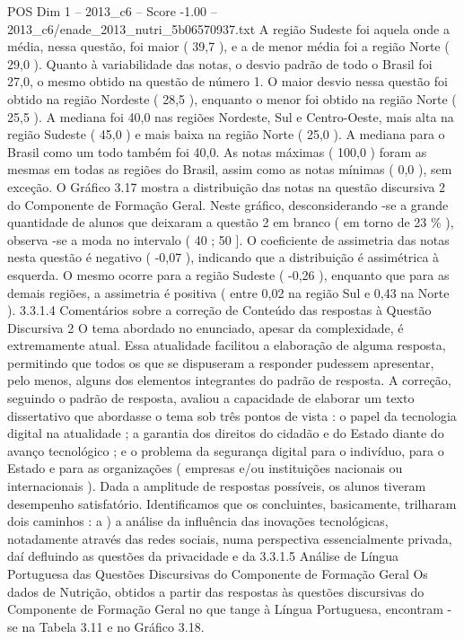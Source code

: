 \begin{textsample}{POS Dim 1 – 2013\_c6 – Score -1.00 – 2013\_c6/enade\_2013\_nutri\_5b06570937.txt}
A região Sudeste foi aquela onde a média, nessa questão, foi maior ( 39,7 ), e a de menor média foi a região Norte ( 29,0 ).
Quanto à variabilidade das notas, o desvio padrão de todo o Brasil foi 27,0, o mesmo obtido na questão de número 1.
O maior desvio nessa questão foi obtido na região Nordeste ( 28,5 ), enquanto o menor foi obtido na região Norte ( 25,5 ).
A mediana foi 40,0 nas regiões Nordeste, Sul e Centro-Oeste, mais alta na região Sudeste ( 45,0 ) e mais baixa na região Norte ( 25,0 ).
A mediana para o Brasil como um todo também foi 40,0.
As notas máximas ( 100,0 ) foram as mesmas em todas as regiões do Brasil, assim como as notas mínimas ( 0,0 ), sem exceção.
O Gráfico 3.17 mostra a distribuição das notas na questão discursiva 2 do Componente de Formação Geral.
Neste gráfico, desconsiderando -se a grande quantidade de alunos que deixaram a questão 2 em branco ( em torno de 23 \% ), observa -se a moda no intervalo ( 40 ; 50 ].
O coeficiente de assimetria das notas nesta questão é negativo ( -0,07 ), indicando que a distribuição é assimétrica à esquerda.
O mesmo ocorre para a região Sudeste ( -0,26 ), enquanto que para as demais regiões, a assimetria é positiva ( entre 0,02 na região Sul e 0,43 na Norte ). 3.3.1.4 Comentários sobre a correção de Conteúdo das respostas à Questão Discursiva 2 O tema abordado no enunciado, apesar da complexidade, é extremamente atual.
Essa atualidade facilitou a elaboração de alguma resposta, permitindo que todos os que se dispuseram a responder pudessem apresentar, pelo menos, alguns dos elementos integrantes do padrão de resposta.
A correção, seguindo o padrão de resposta, avaliou a capacidade de elaborar um texto dissertativo que abordasse o tema sob três pontos de vista : o papel da tecnologia digital na atualidade ; a garantia dos direitos do cidadão e do Estado diante do avanço tecnológico ; e o problema da segurança digital para o indivíduo, para o Estado e para as organizações ( empresas e/ou instituições nacionais ou internacionais ).
Dada a amplitude de respostas possíveis, os alunos tiveram desempenho satisfatório.
Identificamos que os concluintes, basicamente, trilharam dois caminhos : a ) a análise da influência das inovações tecnológicas, notadamente através das redes sociais, numa perspectiva essencialmente privada, daí defluindo as questões da privacidade e da 3.3.1.5 Análise de Língua Portuguesa das Questões Discursivas do Componente de Formação Geral Os dados de Nutrição, obtidos a partir das respostas às questões discursivas do Componente de Formação Geral no que tange à Língua Portuguesa, encontram -se na Tabela 3.11 e no Gráfico 3.18.

\end{textsample}
